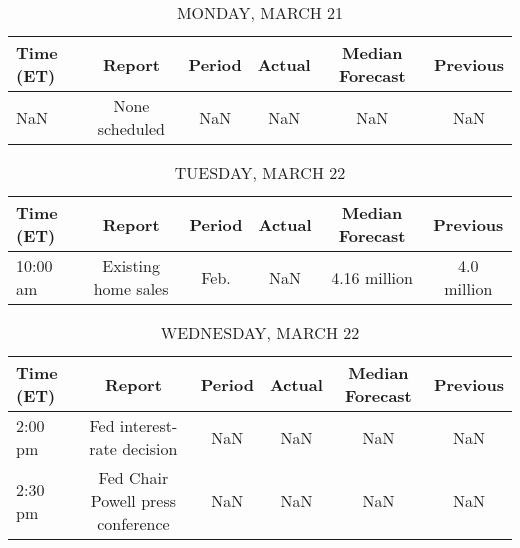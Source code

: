 \documentclass{article}%
\begin{document}
%
\normalsize%


\begin{table}[htbp]%
\caption{MONDAY, MARCH 21}%
\centering%
\begin{adjustbox}{width=1\textwidth}%
\begin{tabular}{lccccc}
\toprule
Time (ET) &         Report & Period & Actual & Median Forecast & Previous \\
\midrule
      NaN & None scheduled &    NaN &    NaN &             NaN &      NaN \\
\bottomrule
\end{tabular}
%
\end{adjustbox}%
\end{table}

%


\begin{table}[htbp]%
\caption{TUESDAY, MARCH 22}%
\centering%
\begin{adjustbox}{width=1\textwidth}%
\begin{tabular}{lccccc}
\toprule
Time (ET) &              Report & Period & Actual & Median Forecast &    Previous \\
\midrule
 10:00 am & Existing home sales &   Feb. &    NaN &    4.16 million & 4.0 million \\
\bottomrule
\end{tabular}
%
\end{adjustbox}%
\end{table}

%


\begin{table}[htbp]%
\caption{WEDNESDAY, MARCH 22}%
\centering%
\begin{adjustbox}{width=1\textwidth}%
\begin{tabular}{lccccc}
\toprule
Time (ET) &                            Report & Period & Actual & Median Forecast & Previous \\
\midrule
  2:00 pm &        Fed interest-rate decision &    NaN &    NaN &             NaN &      NaN \\
  2:30 pm & Fed Chair Powell press conference &    NaN &    NaN &             NaN &      NaN \\
\bottomrule
\end{tabular}
%
\end{adjustbox}%
\end{table}

%
\end{document}
